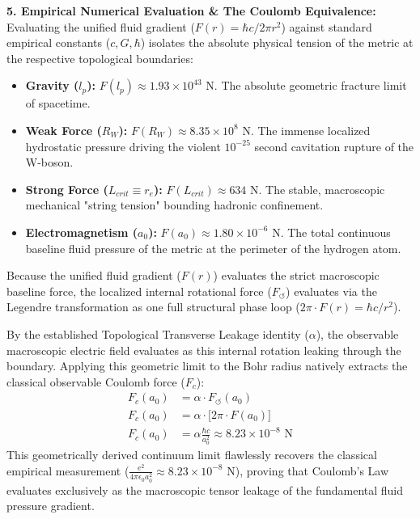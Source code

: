 \documentclass[11pt, a4paper]{article}
\begin{document}
\textbf{5. Empirical Numerical Evaluation \& The Coulomb Equivalence:} \\
Evaluating the unified fluid gradient ($F(r) = \hbar c / 2\pi r^2$) against standard empirical constants ($c, G, \hbar$) isolates the absolute physical tension of the metric at the respective topological boundaries:
\begin{itemize}[nosep]
    \item \textbf{Gravity ($l_p$):} $F(l_p) \approx 1.93 \times 10^{43} \text{ N}$. The absolute geometric fracture limit of spacetime.
    \item \textbf{Weak Force ($R_W$):} $F(R_W) \approx 8.35 \times 10^8 \text{ N}$. The immense localized hydrostatic pressure driving the violent $10^{-25}$ second cavitation rupture of the W-boson.
    \item \textbf{Strong Force ($L_{crit} \equiv r_e$):} $F(L_{crit}) \approx 634 \text{ N}$. The stable, macroscopic mechanical "string tension" bounding hadronic confinement.
    \item \textbf{Electromagnetism ($a_0$):} $F(a_0) \approx 1.80 \times 10^{-6} \text{ N}$. The total continuous baseline fluid pressure of the metric at the perimeter of the hydrogen atom.
\end{itemize}

Because the unified fluid gradient ($F(r)$) evaluates the strict macroscopic baseline force, the localized internal rotational force ($F_{\circlearrowleft}$) evaluates via the Legendre transformation as one full structural phase loop ($2\pi \cdot F(r) = \hbar c / r^2$). 

By the established Topological Transverse Leakage identity ($\alpha$), the observable macroscopic electric field evaluates as this internal rotation leaking through the boundary. Applying this geometric limit to the Bohr radius natively extracts the classical observable Coulomb force ($F_c$):
\begin{align}
    F_c(a_0) &= \alpha \cdot F_{\circlearrowleft}(a_0) \nonumber \\
    F_c(a_0) &= \alpha \cdot \Big[ 2\pi \cdot F(a_0) \Big] \nonumber \\
    F_c(a_0) &= \alpha \frac{\hbar c}{a_0^2} \approx 8.23 \times 10^{-8} \text{ N} 
\end{align}
This geometrically derived continuum limit flawlessly recovers the classical empirical measurement ($\frac{e^2}{4\pi \epsilon_0 a_0^2} \approx 8.23 \times 10^{-8} \text{ N}$),   proving that Coulomb's Law evaluates exclusively as the macroscopic tensor leakage of the fundamental fluid pressure gradient.
\end{document}
